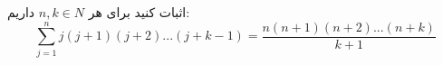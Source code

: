 \begin{PROBLEM}
	\p
	اثبات کنید برای هر 
	$n, k \in N$
	داریم:
	$$\sum_{j = 1}^n j(j+1)(j+2)...(j+k -1) = \frac{n(n+1)(n+2)...(n+k)}{k+1}$$
	\SOLUTION{
		\p

	}
\end{PROBLEM}